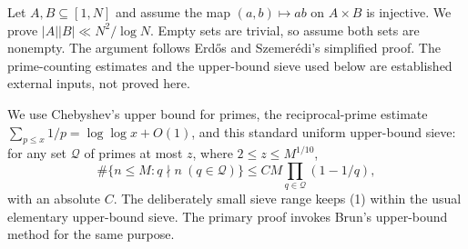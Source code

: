 Let $A,B\subseteq[1,N]$ and assume the map $(a,b)\mapsto ab$ on $A\times B$ is injective. We prove $|A||B|\ll N^2/\log N$. Empty sets are trivial, so assume both sets are nonempty. The argument follows Erd\H{o}s and Szemer\'edi's simplified proof. The prime-counting estimates and the upper-bound sieve used below are established external inputs, not proved here.

We use Chebyshev's upper bound for primes, the reciprocal-prime estimate $\sum_{p\le x}1/p=\log\log x+O(1)$, and this standard uniform upper-bound sieve: for any set $\mathcal Q$ of primes at most $z$, where $2\le z\le M^{1/10}$,
\[\#\{n\le M:q\nmid n\ (q\in\mathcal Q)\}
\le C M\prod_{q\in\mathcal Q}(1-1/q),\tag{1}\]
with an absolute $C$. The deliberately small sieve range keeps (1) within the usual elementary upper-bound sieve. The primary proof invokes Brun's upper-bound method for the same purpose.
